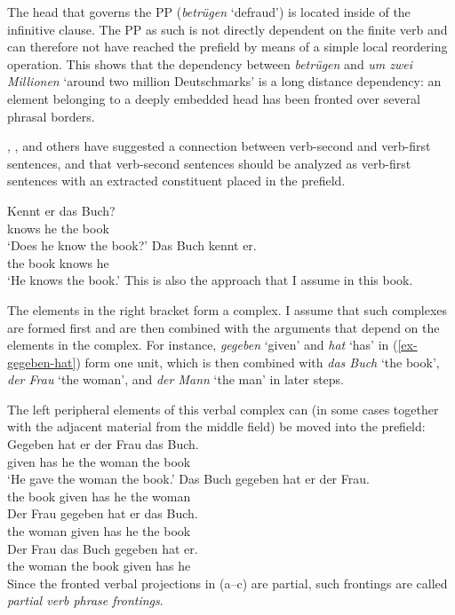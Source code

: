 \z
%
The head that governs the PP (\emph{betrügen} `defraud') is located inside of the infinitive clause. The PP as such is not directly dependent on the finite
verb and can therefore not have reached the prefield by means of a simple local reordering operation. This
shows that the dependency between \emph{betrügen} and \emph{um zwei Millionen} `around two million
Deutschmarks' is a long distance dependency: an element belonging to a deeply embedded head has been fronted over several phrasal borders.

\citet{Thiersch78a}, \citet[]{denBesten83a}, \citet{Uszkoreit87a} and others have suggested 
a connection between verb-second and verb-first sentences, and that verb-second sentences should be
analyzed as verb-first sentences with an extracted constituent placed in the prefield.

\eal
\ex 
\gll Kennt er das Buch?\\
	knows he the book\\
\glt `Does he know the book?'
\ex 
\gll Das Buch kennt er.\\
	the book knows he\\
\glt `He knows the book.'
\zl 
This is also the approach that I assume in this book.


The elements in the right bracket form a complex. I assume that such complexes are formed first and
are then combined with the arguments that depend on the elements in the complex. For instance, \emph{gegeben} `given' and
\emph{hat} `has' in (\ref{ex-gegeben-hat}) form one unit, which is then combined with \emph{das
  Buch} `the book', \emph{der Frau} `the woman', and  \emph{der Mann} `the man' in later steps. 

The left peripheral elements of this verbal complex can (in some cases together with the adjacent material
from the middle field) be moved into the prefield:
\eal
\ex
\gll Gegeben hat er der Frau das Buch.\\
     given has he the woman the book\\
\glt `He gave the woman the book.'
\ex
\gll Das Buch gegeben hat er der Frau.\\
     the book given   has he the woman\\
\ex
\gll Der Frau gegeben hat er das Buch.\\
     the woman given  has he the book\\
\ex
\gll Der Frau  das Buch gegeben hat er.\\
     the woman the book given   has he\\
\zl
Since the fronted verbal projections in (a--c) are partial, such frontings are called \emph{partial verb
phrase frontings}.

